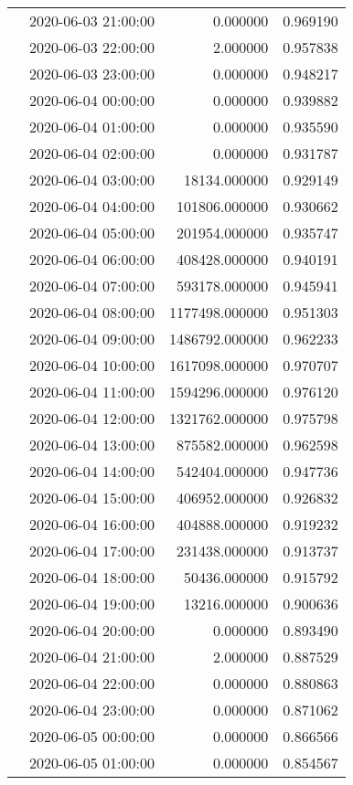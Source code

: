 \begin{tabular}{llrr}
 & 2020-06-03 21:00:00 & 0.000000 & 0.969190 \\
 & 2020-06-03 22:00:00 & 2.000000 & 0.957838 \\
 & 2020-06-03 23:00:00 & 0.000000 & 0.948217 \\
 & 2020-06-04 00:00:00 & 0.000000 & 0.939882 \\
 & 2020-06-04 01:00:00 & 0.000000 & 0.935590 \\
 & 2020-06-04 02:00:00 & 0.000000 & 0.931787 \\
 & 2020-06-04 03:00:00 & 18134.000000 & 0.929149 \\
 & 2020-06-04 04:00:00 & 101806.000000 & 0.930662 \\
 & 2020-06-04 05:00:00 & 201954.000000 & 0.935747 \\
 & 2020-06-04 06:00:00 & 408428.000000 & 0.940191 \\
 & 2020-06-04 07:00:00 & 593178.000000 & 0.945941 \\
 & 2020-06-04 08:00:00 & 1177498.000000 & 0.951303 \\
 & 2020-06-04 09:00:00 & 1486792.000000 & 0.962233 \\
 & 2020-06-04 10:00:00 & 1617098.000000 & 0.970707 \\
 & 2020-06-04 11:00:00 & 1594296.000000 & 0.976120 \\
 & 2020-06-04 12:00:00 & 1321762.000000 & 0.975798 \\
 & 2020-06-04 13:00:00 & 875582.000000 & 0.962598 \\
 & 2020-06-04 14:00:00 & 542404.000000 & 0.947736 \\
 & 2020-06-04 15:00:00 & 406952.000000 & 0.926832 \\
 & 2020-06-04 16:00:00 & 404888.000000 & 0.919232 \\
 & 2020-06-04 17:00:00 & 231438.000000 & 0.913737 \\
 & 2020-06-04 18:00:00 & 50436.000000 & 0.915792 \\
 & 2020-06-04 19:00:00 & 13216.000000 & 0.900636 \\
 & 2020-06-04 20:00:00 & 0.000000 & 0.893490 \\
 & 2020-06-04 21:00:00 & 2.000000 & 0.887529 \\
 & 2020-06-04 22:00:00 & 0.000000 & 0.880863 \\
 & 2020-06-04 23:00:00 & 0.000000 & 0.871062 \\
 & 2020-06-05 00:00:00 & 0.000000 & 0.866566 \\
 & 2020-06-05 01:00:00 & 0.000000 & 0.854567 \\

\end{tabular}
